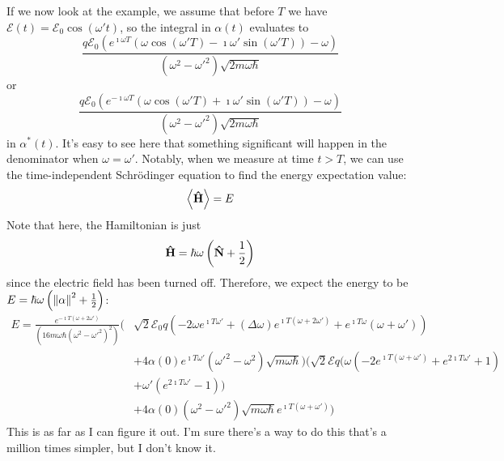 \documentclass[a4paper,twoside]{article}
\begin{document}
\begin{itemize}
\begin{problem}
            If we now look at the example, we assume that before $ T $ we have $ \mathscr{E}(t) = \mathscr{E}_0 \cos(\omega't) $, so the integral in $ \alpha(t) $ evaluates to
            \begin{equation}
                \frac{q\mathscr{E}_0 \left( e^{\imath \omega T} (\omega \cos(\omega'T) - \imath \omega' \sin(\omega'T)) - \omega \right)}{(\omega^2 - \omega'^2) \sqrt{2m \omega \hbar}}
            \end{equation}
            or
            \begin{equation}
                \frac{q\mathscr{E}_0 \left( e^{-\imath \omega T} (\omega \cos(\omega'T) + \imath \omega' \sin(\omega'T)) - \omega \right)}{(\omega^2 - \omega'^2) \sqrt{2m \omega \hbar}}
            \end{equation}
            in $ \alpha^*(t) $. It's easy to see here that something significant will happen in the denominator when $ \omega = \omega' $. Notably, when we measure at time $ t > T$, we can use the time-independent Schr\"odinger equation to find the energy expectation value:
            \begin{equation}
                \ev{ \vu{H}} = E
            \end{equation}
            Note that here, the Hamiltonian is just
            \begin{equation}
                \vu{H} = \hbar \omega \left( \vu{N} + \frac{1}{2} \right)
            \end{equation}
            since the electric field has been turned off. Therefore, we expect the energy to be $ E = \hbar \omega \left( \norm{\alpha}^2 + \frac{1}{2} \right) $:
            \begin{align}
                E = \frac{e^{-\imath T (\omega+2 \omega')}}{(16 m \omega \hbar (\omega^2-\omega'^2)^2)} (&\sqrt{2} \mathscr{E}_0 q (-2 \omega e^{\imath T \omega'}+(\Delta\omega) e^{\imath T (\omega+2 \omega')}+e^{\imath T \omega} (\omega+\omega'))\\
                &+4 \alpha(0) e^{\imath T \omega'} (\omega'^2-\omega^2) \sqrt{m \omega \hbar }) (\sqrt{2} \mathscr{E} q (\omega (-2 e^{\imath T (\omega+\omega')}+e^{2 \imath T \omega'}+1)\\
                &+\omega' (e^{2 \imath T \omega'}-1))\\
                &+4 \alpha(0) (\omega^2-\omega'^2) \sqrt{m \omega \hbar } e^{\imath T (\omega+\omega')})
            \end{align}
            This is as far as I can figure it out. I'm sure there's a way to do this that's a million times simpler, but I don't know it.
        \end{problem}
\end{itemize}
\end{document}
